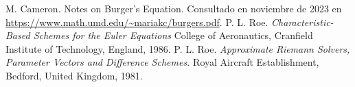 \begin{thebibliography}{99}
 M. Cameron. Notes on Burger's Equation. Consultado en noviembre de 2023 en \url{https://www.math.umd.edu/~mariakc/burgers.pdf}.
%
%
 P. L. Roe. \textit{Characteristic-Based Schemes for the Euler Equations} College of Aeronautics, Cranfield Institute of Technology, England, 1986.
%
 P. L. Roe. \textit{Approximate Riemann Solvers, Parameter Vectors and Difference Schemes.} Royal Aircraft Establishment, Bedford, United Kingdom, 1981.
%
%
%
%
%
%
%
%
%
%
%
%
%
%
%
%

\end{thebibliography}
